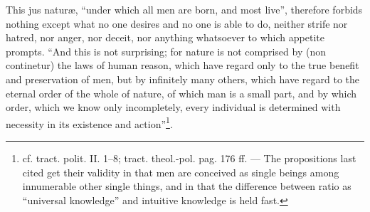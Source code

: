 \documentclass[12pt,a4paper,openany]{book}
\begin{document}
This jus naturæ, ``under which all men are born, and most live'', therefore forbids nothing except what no one desires and no one is able to do, neither strife nor hatred, nor anger, nor deceit, nor anything whatsoever to which appetite prompts. ``And this is not surprising; for nature is not comprised by (non continetur) the laws of human reason, which have regard only to the true benefit and preservation of men, but by infinitely many others, which have regard to the eternal order of the whole of nature, of which man is a small part, and by which order, which we know only incompletely, every individual is determined with necessity in its existence and action''\footnote{cf. tract. polit. II. 1--8; tract. theol.-pol. pag. 176 ff. --- The propositions last cited get their validity in that men are conceived as single beings among innumerable other single things, and in that the difference between ratio as ``universal knowledge'' and intuitive knowledge is held fast.}.
\end{document}
